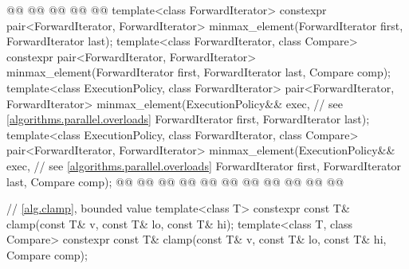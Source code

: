 \begin{codeblock}
{    @@
        @@
      @@
        @@
  @\added{\}}@
  template<class ForwardIterator>
    constexpr pair<ForwardIterator, ForwardIterator>
      minmax_element(ForwardIterator first, ForwardIterator last);
  template<class ForwardIterator, class Compare>
    constexpr pair<ForwardIterator, ForwardIterator>
      minmax_element(ForwardIterator first, ForwardIterator last, Compare comp);
  template<class ExecutionPolicy, class ForwardIterator>
    pair<ForwardIterator, ForwardIterator>
      minmax_element(ExecutionPolicy&& exec, // see \ref{algorithms.parallel.overloads}
                     ForwardIterator first, ForwardIterator last);
  template<class ExecutionPolicy, class ForwardIterator, class Compare>
    pair<ForwardIterator, ForwardIterator>
      minmax_element(ExecutionPolicy&& exec, // see \ref{algorithms.parallel.overloads}
                     ForwardIterator first, ForwardIterator last, Compare comp);
  @@
    @@
        @@
      @@
        @@
    @@
        @@
      @@
                  @@
        @@
  @\added{\}}@

  // \ref{alg.clamp}, bounded value
  template<class T>
    constexpr const T& clamp(const T& v, const T& lo, const T& hi);
  template<class T, class Compare>
    constexpr const T& clamp(const T& v, const T& lo, const T& hi, Compare comp);

}
\end{codeblock}

